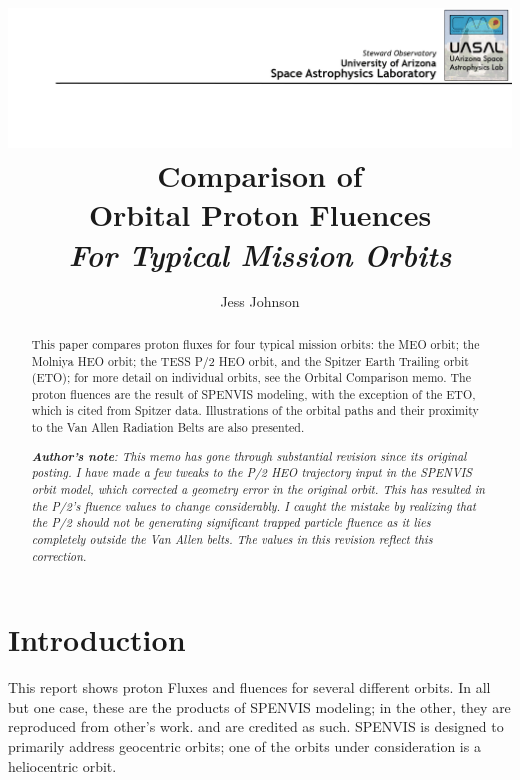 \documentclass[11pt]{article}
\title{
    {\vspace{-1.5cm}}
    {\hspace{-2cm}}   
    {\includegraphics{assets/UASAL_Header.png}}
    {\large Comparison of}\\
    {Orbital Proton Fluences}\\
    {\Large \textit{For Typical Mission Orbits}}
 }
\author{\large Jess Johnson}
\affil{\small Senior Instrumentation Scientist \\ Steward Observatory, University of Arizona \\ September 28, 2023}
\date{}
\begin{document}
\maketitle


\begin{abstract}
This paper compares proton fluxes for four typical mission orbits: the MEO orbit; the Molniya HEO orbit; the TESS P/2 HEO orbit, and the Spitzer Earth Trailing orbit (ETO); for more detail on individual orbits, see the Orbital Comparison memo. The proton fluences are the result of SPENVIS modeling, with the exception of the ETO, which is cited from Spitzer data. Illustrations of the orbital paths and their proximity to the Van Allen Radiation Belts are also presented.

\vspace{5mm}

\textit{\textbf{Author's note}: This memo has gone through substantial revision since its original posting. I have made a few tweaks to the P/2 HEO trajectory input in the SPENVIS orbit model, which corrected a geometry error in the original orbit. This has resulted in the P/2's fluence values to change considerably. I caught the mistake by realizing that the P/2 should not be generating significant trapped particle fluence as it lies completely outside the Van Allen belts. The values in this revision reflect this correction.} 

\end{abstract}

\newpage


\tableofcontents

\newpage


\section{Introduction}

This report shows proton Fluxes and fluences for several different orbits. In all but one case, these are the products of SPENVIS modeling; in the other, they are reproduced from other's work. and are credited as such. SPENVIS is designed to primarily address geocentric orbits; one of the orbits under consideration is a heliocentric orbit.
\end{document}
